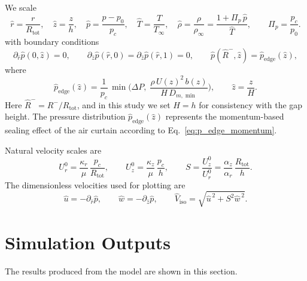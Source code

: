 \documentclass[11pt,a4paper]{article}
\begin{document}
We scale
\begin{equation}
  \hat r=\frac{r}{R_{\mathrm{tot}}},\quad
  \hat z=\frac{z}{h},\quad
  \hat p=\frac{p-p_0}{p_c},\quad
  \hat T=\frac{T}{T_\infty},\quad
  \hat\rho=\frac{\rho}{\rho_\infty}
  =\frac{1+\Pi_p\,\hat p}{\hat T},\qquad
  \Pi_p=\frac{p_c}{p_0}.
\end{equation}
with boundary conditions
\begin{equation}
  \partial_{\hat r}\hat p(0,\hat z)=0, \qquad
  \partial_{\hat z}\hat p(\hat r,0)=\partial_{\hat z}\hat p(\hat r,1)=0, \qquad
  \hat p(\hat R^{-},\hat z)=\hat p_{\mathrm{edge}}(\hat z),
\end{equation}
where
\begin{equation}
  \hat p_{\mathrm{edge}}(\hat z)
  =\frac{1}{p_c}\,
   \min\!\Big(
      \Delta P,\;
      \frac{\rho\,U(z)^2\,b(z)}{H\,D_{m,\min}}
    \Big),
  \qquad
  \hat z=\frac{z}{H}.
\end{equation}
Here $\hat R^{-}=R^{-}/R_{\mathrm{tot}}$, and in this study we set $H=h$
for consistency with the gap height.  The pressure distribution
$\hat p_{\mathrm{edge}}(\hat z)$ represents the momentum-based
sealing effect of the air curtain according to
Eq.~\eqref{eq:p_edge_momentum}.

Natural velocity scales are
\begin{equation}
  U_r^0=\frac{\kappa_r}{\mu}\,\frac{p_c}{R_{\mathrm{tot}}},\qquad
  U_z^0=\frac{\kappa_z}{\mu}\,\frac{p_c}{h},\qquad
  S=\frac{U_z^0}{U_r^0}
  =\frac{\alpha_z}{\alpha_r}\,\frac{R_{\mathrm{tot}}}{h}.
\end{equation}
The dimensionless velocities used for plotting are
\begin{equation}
  \hat u=-\partial_{\hat r}\hat p,\qquad
  \hat w=-\partial_{\hat z}\hat p,\qquad
  \hat V_{\mathrm{iso}}=\sqrt{\hat u^{\,2}+S^{2}\hat w^{\,2}}.
\end{equation}

\section{Simulation Outputs}
\label{sec:simulation-outputs}

The results produced from the model are shown in this section.
\end{document}
